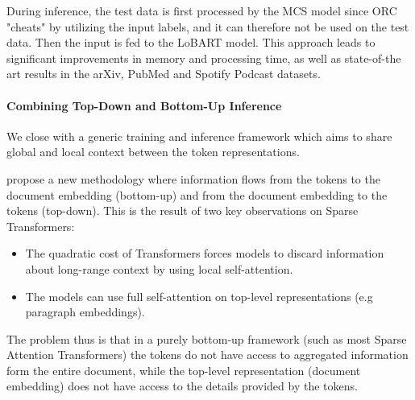 \documentclass[preprint,review,12pt]{elsarticle}
\begin{document}
During inference, the test data is first processed by the MCS model since ORC "cheats" by utilizing the input labels, and it can therefore not be used on the test data. Then the input is fed to the LoBART model. This approach leads to significant improvements in memory and processing time, as well as state-of-the art results in the arXiv, PubMed and Spotify Podcast datasets. %


\paragraph{Combining Top-Down and Bottom-Up Inference} We close with a generic training and inference framework which aims to share global and local context between the token representations.


\citet{pan_bottom} propose a new methodology where information flows from the tokens to the document embedding (bottom-up) and from the document embedding to the tokens (top-down). This is the result of two key observations on Sparse Transformers:

\begin{itemize}
    \item The quadratic cost of Transformers forces models to discard information about long-range context by using local self-attention.
    \item The models can use full self-attention on top-level representations (e.g paragraph embeddings).
\end{itemize}

The problem thus is that in a purely bottom-up framework (such as most Sparse Attention Transformers) the tokens do not have access to aggregated information form the entire document, while the top-level representation (document embedding) does not have access to the details provided by the tokens.
\end{document}
